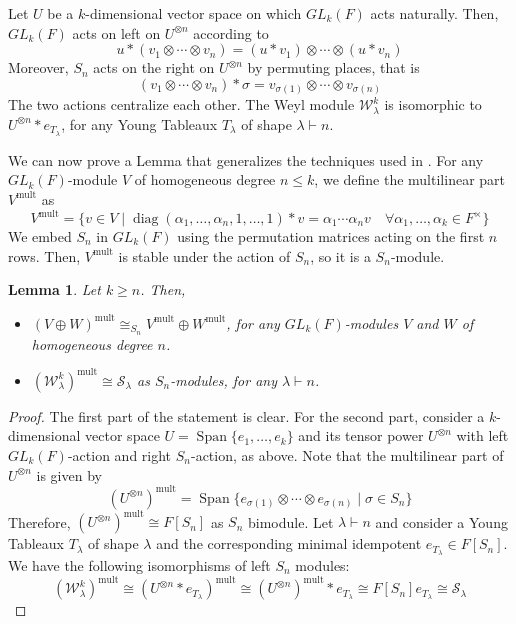 \documentclass{article}
\newtheorem{lemma}[theorem]{Lemma}
\newcommand{\cS}{\mathcal{S}}
\newcommand{\cW}{\mathcal{W}}
\DeclareMathOperator{\diag}{diag}
\DeclareMathOperator{\spn}{Span}
\DeclareMathOperator{\mult}{mult}
\begin{document}
Let $U$ be a $k$-dimensional vector space on which $GL_k(F)$ acts naturally. Then, $GL_k(F)$ acts on left on $U^{\otimes n}$ according to 
\[u\ast (v_1\otimes\cdots\otimes v_n)= (u*v_1)\otimes\cdots\otimes(u*v_n)\]
Moreover, $S_n$ acts on the right on $U^{\otimes n}$ by permuting places, that is 
\[(v_1\otimes\cdots\otimes v_n) \ast \sigma = v_{\sigma(1)}\otimes\cdots\otimes v_{\sigma(n)}\]
The two actions centralize each other. The Weyl module $\cW_\lambda^k$ is isomorphic to $U^{\otimes n}*e_{T_\lambda}$, for any Young Tableaux $T_\lambda$ of shape $\lambda\vdash n$.

We can now prove a Lemma that generalizes the techniques used in \cite[Lemma 7]{Ber96}. For any $GL_k(F)$-module $V$ of homogeneous degree $n\leq k$, we define the multilinear part $V^{\mult}$ as
\[ V^{\mult} = \{ v\in V\mid \diag(\alpha_1,\dots,\alpha_n,1,\dots,1)\ast v = \alpha_1\cdots\alpha_n v\quad \forall \alpha_1,\dots,\alpha_k\in F^\times \} \]
We embed $S_n$ in $GL_k(F)$ using the permutation matrices acting on the first $n$ rows. Then, $V^{\mult}$ is stable under the action of $S_n$, so it is a $S_n$-module.

\begin{lemma}\label{lem: mult}
	Let $k\geq n$. Then, \begin{itemize}
		\item $(V\oplus W)^{\mult} \cong_{S_n} V^{\mult} \oplus W^{\mult}$, for any $GL_k(F)$-modules $V$ and $W$ of homogeneous degree $n$.
		\item $( \cW_\lambda^k )^{\mult} \cong  \cS_\lambda$ as $S_n$-modules, for any $\lambda\vdash n$.
	\end{itemize}
\end{lemma}
\begin{proof}
	The first part of the statement is clear. For the second part, consider a $k$-dimensional vector space $U=\spn\{e_1,\dots,e_k\}$ and its tensor power $U^{\otimes n}$ with left $GL_k(F)$-action and right $S_n$-action, as above.
	Note that the multilinear part of $U^{\otimes n}$ is given by
	\[ (U^{\otimes n})^{\mult} = \spn\{ e_{\sigma(1)}\otimes\cdots\otimes e_{\sigma(n)} \mid \sigma \in S_n  \} \]
	Therefore, $(U^{\otimes n})^{\mult} \cong F[S_n]$ as $S_n$ bimodule. Let $\lambda\vdash n$ and consider a Young Tableaux $T_\lambda$ of shape $\lambda$ and the corresponding minimal idempotent $e_{T_\lambda} \in F[S_n]$.
	We have the following isomorphisms of left $S_n$ modules:
	\[( \cW_\lambda^k )^{\mult} \cong  (U^{\otimes n}*e_{T_\lambda})^{\mult} \cong  (U^{\otimes n})^{\mult}*e_{T_\lambda}  \cong  F[S_n]e_{T_\lambda} \cong \cS_\lambda\] 
\end{proof}
\end{document}

